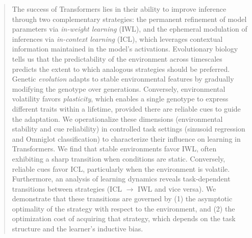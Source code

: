 \begin{abstract}
The success of Transformers lies in their ability to improve inference through two complementary strategies: the permanent refinement of model parameters via \textit{in-weight learning} (IWL), and the ephemeral modulation of inferences via \textit{in-context learning} (ICL), which leverages contextual information maintained in the model's activations.
Evolutionary biology tells us that the predictability of the environment across timescales predicts the extent to which analogous strategies should be preferred. Genetic \textit{evolution} adapts to stable environmental features by gradually modifying the genotype over generations. Conversely, environmental volatility favors \textit{plasticity}, which enables a single genotype to express different traits within a lifetime, provided there are reliable cues to guide the adaptation.
We operationalize these dimensions (environmental stability and cue reliability) in controlled task settings (sinusoid regression and Omniglot classification) to characterize their influence on learning in Transformers.
We find that stable environments favor IWL, often exhibiting a sharp transition when conditions are static. Conversely, reliable cues favor ICL, particularly when the environment is volatile.
Furthermore, an analysis of learning dynamics reveals task-dependent transitions between strategies (ICL $\to$ IWL and vice versa). We demonstrate that these transitions are governed by (1) the asymptotic optimality of the strategy with respect to the environment, and (2) the optimization cost of acquiring that strategy, which depends on the task structure and the learner's inductive bias.
\end{abstract}

